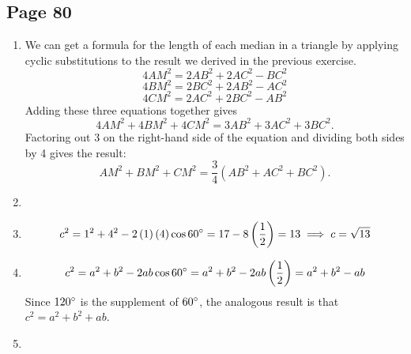 \documentclass{article}
\newenvironment{solutions}[1]
{\subsection*{#1}
 \begin{enumerate}[leftmargin=1.5em]}
{\end{enumerate}}
\newcommand{\solution}{\item}
\begin{document}
\begin{solutions}{Page 80}
\begin{center}
\end{center}
We can create a parallelogram from triangle $ABC$ by creating a copy of the triangle and reflecting it through the point $M$. This allows us to apply the result from the previous exercise about the sum of the squares of the diagonals.
\begin{align*}
AD^2+BC^2 = AB^2+AC^2+BD^2+CD^2 &\implies \left(2AM\right)^2+BC^2 = AB^2+AC^2+AC^2+AB^2 \\
&\implies 4AM^2+BC^2 = 2AB^2+2AC^2 \\
&\implies 4AM^2 = 2AB^2+2AC^2-BC^2
\end{align*}

\solution %
We can get a formula for the length of each median in a triangle by applying cyclic substitutions to the result we derived in the previous exercise.
\[
4AM^2 = 2AB^2+2AC^2-BC^2
\]
\[
4BM^2 = 2BC^2+2AB^2-AC^2
\]
\[
4CM^2 = 2AC^2+2BC^2-AB^2
\]
Adding these three equations together gives
\[
4AM^2+4BM^2+4CM^2 = 3AB^2 + 3AC^2 + 3BC^2.
\]
Factoring out 3 on the right-hand side of the equation and dividing both sides by 4 gives the result:
\[
AM^2+BM^2+CM^2 = \dfrac{3}{4}\left(AB^2+AC^2+BC^2\right).
\]
\solution %
\solution %
\[
c^2 = 1^2 + 4^2 - 2\left(1\right)\left(4\right)\cos{60\degree} = 17-8\left(\dfrac{1}{2}\right) = 13 \implies c = \sqrt{13}
\]

\solution %
\[
c^2=a^2+b^2-2ab\cos{60\degree} =a^2+b^2-2ab\left(\dfrac{1}{2}\right) = a^2+b^2-ab
\]
Since $120\degree$ is the supplement of $60\degree$, the analogous result is that $c^2=a^2+b^2+ab$.

\solution ~ %
\begin{center}
\end{center}


\end{solutions}
\end{document}
